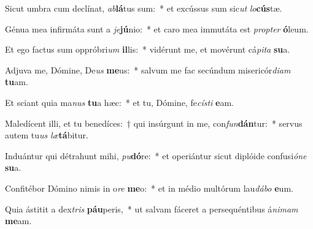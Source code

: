 \item Sicut umbra cum declínat, \textit{ab}\textbf{lá}tus sum:~* et excússus sum sic\textit{ut} \textit{lo}\textbf{cús}tæ.
\item Génua mea infirmáta sunt a \textit{je}\textbf{jú}nio:~* et caro mea immutáta est \textit{prop}\textit{ter} \textbf{ó}leum.
\item Et ego factus sum oppróbri\textit{um} \textbf{il}lis:~* vidérunt me, et movérunt cá\textit{pi}\textit{ta} \textbf{su}a.
\item Adjuva me, Dómine, De\textit{us} \textbf{me}us:~* salvum me fac secúndum misericór\textit{di}\textit{am} \textbf{tu}am.
\item Et sciant quia ma\textit{nus} \textbf{tu}a hæc:~* et tu, Dómine, fe\textit{cís}\textit{ti} \textbf{e}am.
\item Maledícent illi, et tu benedíces:~† qui insúrgunt in me, con\textit{fun}\textbf{dán}tur:~* servus autem tu\textit{us} \textit{læ}\textbf{tá}bitur.
\item Induántur qui détrahunt mihi, \textit{pu}\textbf{dó}re:~* et operiántur sicut diplóide confusi\textit{ó}\textit{ne} \textbf{su}a.
\item Confitébor Dómino nimis in o\textit{re} \textbf{me}o:~* et in médio multórum lau\textit{dá}\textit{bo} \textbf{e}um.
\item Quia ástitit a dex\textit{tris} \textbf{páu}peris,~* ut salvam fáceret a persequéntibus á\textit{ni}\textit{mam} \textbf{me}am.
